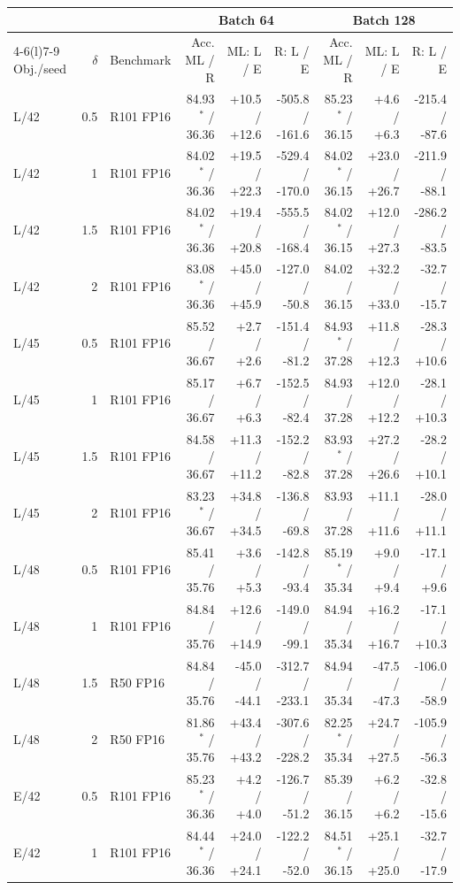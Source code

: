 \begin{tabular}{@{}lrlrrrrrr@{}}
\toprule
& & & \multicolumn{3}{c}{Batch 64} & \multicolumn{3}{c}{Batch 128}\\
\cmidrule(lr){4-6}\cmidrule(l){7-9}
Obj./seed & $\delta$ & Benchmark & Acc. ML / R & ML: L / E & R: L / E & Acc. ML / R & ML: L / E & R: L / E\\\midrule
L/42 & 0.5 & R101 FP16 & 84.93$^*$ / 36.36 & +10.5 / +12.6 & -505.8 / -161.6 & 85.23$^*$ / 36.15 & +4.6 / +6.3 & -215.4 / -87.6\\
L/42 & 1 & R101 FP16 & 84.02$^*$ / 36.36 & +19.5 / +22.3 & -529.4 / -170.0 & 84.02$^*$ / 36.15 & +23.0 / +26.7 & -211.9 / -88.1\\
L/42 & 1.5 & R101 FP16 & 84.02$^*$ / 36.36 & +19.4 / +20.8 & -555.5 / -168.4 & 84.02$^*$ / 36.15 & +12.0 / +27.3 & -286.2 / -83.5\\
L/42 & 2 & R101 FP16 & 83.08$^*$ / 36.36 & +45.0 / +45.9 & -127.0 / -50.8 & 84.02 / 36.15 & +32.2 / +33.0 & -32.7 / -15.7\\
L/45 & 0.5 & R101 FP16 & 85.52 / 36.67 & +2.7 / +2.6 & -151.4 / -81.2 & 84.93$^*$ / 37.28 & +11.8 / +12.3 & -28.3 / +10.6\\
L/45 & 1 & R101 FP16 & 85.17 / 36.67 & +6.7 / +6.3 & -152.5 / -82.4 & 84.93 / 37.28 & +12.0 / +12.2 & -28.1 / +10.3\\
L/45 & 1.5 & R101 FP16 & 84.58 / 36.67 & +11.3 / +11.2 & -152.2 / -82.8 & 83.93$^*$ / 37.28 & +27.2 / +26.6 & -28.2 / +10.1\\
L/45 & 2 & R101 FP16 & 83.23$^*$ / 36.67 & +34.8 / +34.5 & -136.8 / -69.8 & 83.93 / 37.28 & +11.1 / +11.6 & -28.0 / +11.1\\
L/48 & 0.5 & R101 FP16 & 85.41 / 35.76 & +3.6 / +5.3 & -142.8 / -93.4 & 85.19$^*$ / 35.34 & +9.0 / +9.4 & -17.1 / +9.6\\
L/48 & 1 & R101 FP16 & 84.84 / 35.76 & +12.6 / +14.9 & -149.0 / -99.1 & 84.94 / 35.34 & +16.2 / +16.7 & -17.1 / +10.3\\
L/48 & 1.5 & R50 FP16 & 84.84 / 35.76 & -45.0 / -44.1 & -312.7 / -233.1 & 84.94 / 35.34 & -47.5 / -47.3 & -106.0 / -58.9\\
L/48 & 2 & R50 FP16 & 81.86$^*$ / 35.76 & +43.4 / +43.2 & -307.6 / -228.2 & 82.25$^*$ / 35.34 & +24.7 / +27.5 & -105.9 / -56.3\\
E/42 & 0.5 & R101 FP16 & 85.23$^*$ / 36.36 & +4.2 / +4.0 & -126.7 / -51.2 & 85.39 / 36.15 & +6.2 / +6.2 & -32.8 / -15.6\\
E/42 & 1 & R101 FP16 & 84.44$^*$ / 36.36 & +24.0 / +24.1 & -122.2 / -52.0 & 84.51$^*$ / 36.15 & +25.1 / +25.0 & -32.7 / -17.9\\

\end{tabular}
